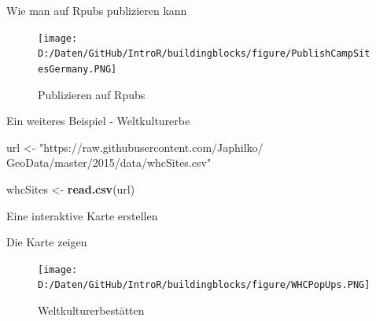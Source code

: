\documentclass[ignorenonframetext,]{beamer}
\newenvironment{Shaded}{\begin{snugshade}}{\end{snugshade}}
\newcommand{\KeywordTok}[1]{\textcolor[rgb]{0.26,0.66,0.93}{\textbf{#1}}}
\newcommand{\DataTypeTok}[1]{\textcolor[rgb]{0.74,0.68,0.62}{\underline{#1}}}
\newcommand{\StringTok}[1]{\textcolor[rgb]{0.02,0.61,0.04}{#1}}
\newcommand{\CommentTok}[1]{\textcolor[rgb]{0.00,0.40,1.00}{\textit{#1}}}
\newcommand{\OperatorTok}[1]{\textcolor[rgb]{0.74,0.68,0.62}{#1}}
\newcommand{\NormalTok}[1]{\textcolor[rgb]{0.74,0.68,0.62}{#1}}
\begin{document}
\begin{frame}{Wie man auf Rpubs publizieren kann}

\begin{figure}
\centering
\texttt{[image: D:/Daten/GitHub/IntroR/buildingblocks/figure/PublishCampSitesGermany.PNG]}
\caption{Publizieren auf Rpubs}
\end{figure}

\end{frame}

\begin{frame}[fragile]{Ein weiteres Beispiel - Weltkulturerbe}

\begin{Shaded}
\begin{Highlighting}[]
\NormalTok{url <-}\StringTok{ "https://raw.githubusercontent.com/Japhilko/}
\StringTok{GeoData/master/2015/data/whcSites.csv"}

\NormalTok{whcSites <-}\StringTok{ }\KeywordTok{read.csv}\NormalTok{(url) }
\end{Highlighting}
\end{Shaded}

\end{frame}

\begin{frame}[fragile]{Eine interaktive Karte erstellen}

\begin{Shaded}
\end{Shaded}

\end{frame}

\begin{frame}{Die Karte zeigen}

\begin{figure}
\centering
\texttt{[image: D:/Daten/GitHub/IntroR/buildingblocks/figure/WHCPopUps.PNG]}
\caption{Weltkulturerbestätten}
\end{figure}

\end{frame}
\end{document}
